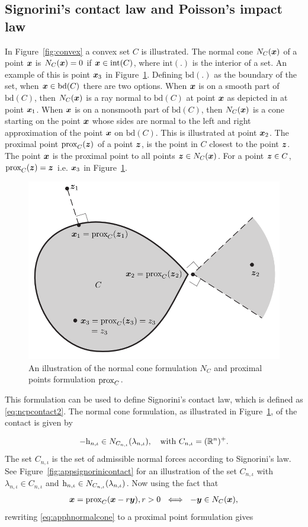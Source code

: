 \documentclass[../DC2017114Bouma.tex]{subfiles}
\begin{document}
\subsection{Signorini's contact law and Poisson's impact law}
In Figure~\ref{fig:convex} a convex set $C$ is illustrated. The normal cone $N_C({\boldsymbol{x}})$ of a point ${\boldsymbol{x}}$ is $N_C({\boldsymbol{x}})=0$ if ${\boldsymbol{x}}\in \text{int}(C)$, where $\text{int}(.)$ is the interior of a set. An example of this is point ${\boldsymbol{x}}_3$ in Figure~\ref{fig:appconvex}. Defining $\text{bd}(.)$ as the boundary of the set, when ${\boldsymbol{x}}\in \text{bd}(C)$ there are two options. When ${\boldsymbol{x}}$ is on a smooth part of $\text{bd}(C)$, then $N_C({\boldsymbol{x}})$ is a ray normal to $\text{bd}(C)$ at point ${\boldsymbol{x}}$ as depicted in at point ${\boldsymbol{x}}_1$. When ${\boldsymbol{x}}$ is on a nonsmooth part of $\text{bd}(C)$, then $N_C({\boldsymbol{x}})$ is a cone starting on the point ${\boldsymbol{x}}$ whose sides are normal to the left and right approximation of the point ${\boldsymbol{x}}$ on $\text{bd}(C)$. This is illustrated at point ${\boldsymbol{x}}_2$. The proximal point $\operatorname{\text{prox}}_C({\boldsymbol{z}})$ of a point ${\boldsymbol{z}}$, is the point in $C$ closest to the point ${\boldsymbol{z}}$. The point ${\boldsymbol{x}}$ is the proximal point to all points  ${\boldsymbol{z}}\in N_C({\boldsymbol{x}})$. For a point ${\boldsymbol{z}}\in C$, $\operatorname{\text{prox}}_C({\boldsymbol{z}}) = {\boldsymbol{z}}$ i.e. ${\boldsymbol{x}}_3$ in Figure~\ref{fig:appconvex}.

\begin{figure}[bt!]
\centering
\includegraphics[width=.6\textwidth]{convex.PNG}\caption{An illustration of the normal cone formulation $N_{C}$ and proximal points formulation $\operatorname{\text{prox}}_C$.}\label{fig:appconvex}
\end{figure}

This formulation can be used to define Signorini's contact law, which is defined as \eqref{eq:ncpcontact2}. The normal cone formulation, as illustrated in Figure~\ref{fig:appconvex}, of the contact is given by

\begin{align}
-\mathrm{h}_{n,\iota} \in N_{C_{n,\iota}}(\lambda_{n,\iota}),\quad \text{with }C_{n,\iota} = (\mathbb{R}^n)^+.\label{eq:apphnormalcone}
\end{align}
The set $C_{n,\iota}$ is the set of admissible normal forces according to Signorini's law. See Figure~\ref{fig:appsignorinicontact} for an illustration of the set $C_{n,\iota}$ with $\lambda_{n,\iota}\in C_{n,\iota}$ and $\mathrm{h}_{n,\iota} \in N_{C_{n,\iota}}(\lambda_{n,\iota})$. Now using the fact that
\begin{align}
{\boldsymbol{x}} = \operatorname{\text{prox}}_C({\boldsymbol{x}} -r{\boldsymbol{y}}), r > 0\ \iff\ -{\boldsymbol{y}}\in N_C({\boldsymbol{x}}),
\end{align}
rewriting \eqref{eq:apphnormalcone} to a proximal point formulation gives 
\end{document}

